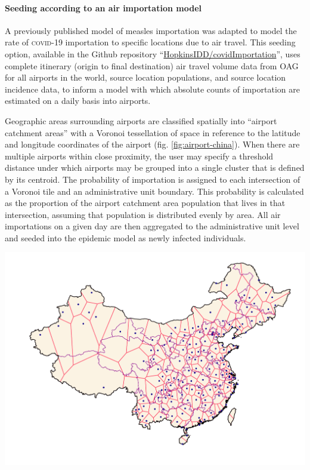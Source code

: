 \paragraph{Seeding according to an air importation model} A previously published model of measles importation was adapted to model the rate of \textsc{covid}-19 importation to specific locations due to air travel\cite{Truelove:EpidemicsAirTravel:2020}. This seeding option, available in the Github repository “\url{HopkinsIDD/covidImportation}”, uses complete itinerary (origin to final destination) air travel volume data from OAG\cite{OAG:FlightDataOAG:2020} for all airports in the world, source location populations, and source location incidence data, to inform a model with which absolute counts of importation are estimated on a daily basis into airports\cite{Truelove:HopkinsIDDCovidImportationInitial:2020}. 

Geographic areas surrounding airports are classified spatially into “airport catchment areas” with a Voronoi tessellation of space in reference to the latitude and longitude coordinates of the airport\cite{Balcan:ModelingSpatialSpread:2010} (fig. \ref{fig:airport-china}). When there are multiple airports within close proximity, the user may specify a threshold distance under which airports may be grouped into a single cluster that is defined by its centroid. The probability of importation is assigned to each intersection of a Voronoi tile and an administrative unit boundary. This probability is calculated as the proportion of the airport catchment area population that lives in that intersection, assuming that population is distributed evenly by area. All air importations on a given day are then aggregated to the administrative unit level and seeded into the epidemic model as newly infected individuals.

 \begin{marginfigure}%
\centering
\includegraphics{fig_pipeline/airport_tessellation.pdf}
\label{fig:airport-china}
\end{marginfigure}

